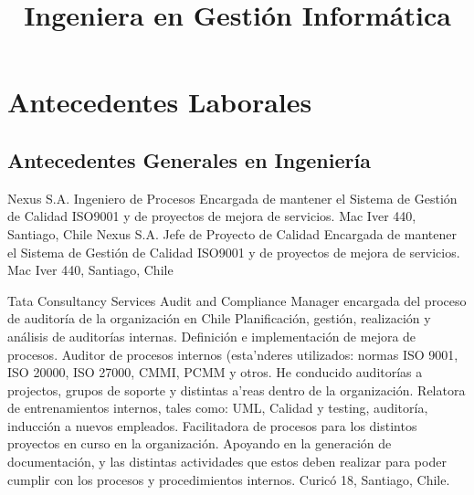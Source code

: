 \documentclass[11pt,letterpaper,roman]{moderncv}
\title{\normalfont \small Ingeniera en Gestión Informática}
\begin{document}
\maketitle

	
	
\section{Antecedentes Laborales}


\subsection{Antecedentes Generales en Ingeniería}
	{Nexus S.A.} %
	{Ingeniero de Procesos} %
	{Encargada de mantener el Sistema de Gestión de Calidad ISO9001 y de proyectos de mejora de servicios.
	}{}
	{Mac Iver 440, Santiago, Chile}
	{Nexus S.A.} %
	{Jefe de Proyecto de Calidad} %
	{Encargada de mantener el Sistema de Gestión de Calidad ISO9001 y de proyectos de mejora de servicios.
	}{}
	{Mac Iver 440, Santiago, Chile}

	{Tata Consultancy Services} %
	{Audit and Compliance Manager} %
	{encargada del proceso de auditoría de la organización en Chile}
	{Planificación, gestión, realización y análisis de auditorías internas. Definición e implementación de mejora de procesos. 
	Auditor de procesos internos (esta'nderes utilizados: normas ISO 9001, ISO 20000, ISO 27000, CMMI, PCMM y otros.
	He conducido auditorías a projectos, grupos de soporte y distintas a'reas dentro de la organización. 
	Relatora de entrenamientos internos, tales como: UML, Calidad y testing, auditoría, inducción a nuevos empleados.
	Facilitadora de procesos para los distintos proyectos en curso en la organización.
	Apoyando en la generación de documentación, y las distintas actividades que estos deben realizar para poder cumplir con los procesos y procedimientos internos.
	}
	{Curicó 18, Santiago, Chile.}
	
\end{document}
